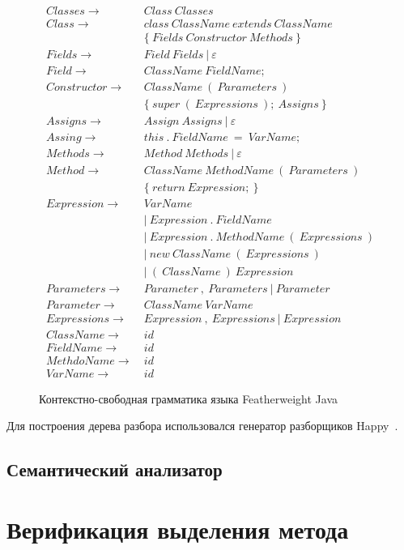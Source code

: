 \begin{figure}[H]
    \begin{align*}
        Classes \rightarrow&\ Class\ Classes\\
        Class \rightarrow&\ class\ ClassName\ extends\ ClassName\\
        &\ \{\ Fields\ Constructor\ Methods\ \}\\
        Fields \rightarrow&\ Field\ Fields\ |\ \varepsilon\\
        Field \rightarrow&\ ClassName\ FieldName;\\
        Constructor \rightarrow& \ ClassName\ (\ Parameters\ )\\
        &\ \{\ super\ (\ Expressions\ );\ Assigns\ \}\\
        Assigns \rightarrow&\ Assign\ Assigns\ |\ \varepsilon\\
        Assing \rightarrow&\ this\ .\ FieldName\ =\ VarName;\\
        Methods \rightarrow&\ Method\ Methods\ |\ \varepsilon\\
        Method \rightarrow&\ ClassName\ MethodName\ (\ Parameters\ )\\
        &\ \{\ return\ Expression;\ \}\\
        Expression \rightarrow&\ VarName\\
        &\ |\ Expression\ .\ FieldName\\
        &\ |\ Expression\ .\ MethodName\ (\ Expressions\ )\\
        &\ |\ new\ ClassName\ (\ Expressions\ )\\
        &\ |\ (\ ClassName\ )\ Expression\\
        Parameters \rightarrow&\ Parameter\ ,\ Parameters\ |\ Parameter\\
        Parameter \rightarrow&\ ClassName\ VarName\\
        Expressions \rightarrow&\ Expression\ ,\ Expressions\ |\ Expression\\
        ClassName \rightarrow&\ id\\
        FieldName \rightarrow&\ id\\
        MethdoName \rightarrow&\ id\\
        VarName \rightarrow&\ id
    \end{align*}
    \caption{Контекстно-свободная грамматика языка Featherweight Java}
    \label{cf-fj}
\end{figure}
Для построения дерева разбора использовался генератор разборщиков Happy~\cite{happy}.
\subsection{Семантический анализатор}

\section{Верификация выделения метода}